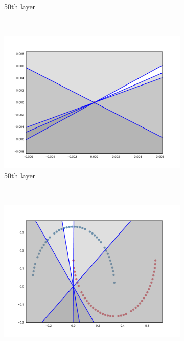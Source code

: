 \begin{figure}
\begin{subfigure}[b]{0.3\textwidth}
        \caption{\ReLU 50th layer}
        \label{fig:reluInit501}
    \end{subfigure}
    ~ %
    \begin{subfigure}[b]{0.3\textwidth}
        \includegraphics[width=\textwidth]{img/init/relu/conv2d_50-2.pdf}
        \caption{\ReLU 50th layer}
        \label{fig:reluInit502}
    \end{subfigure}
    \\
    \begin{subfigure}[b]{0.3\textwidth}
        \includegraphics[width=\textwidth]{img/init/relu-bn/conv2d_1-0.pdf}

\end{subfigure}
\end{figure}
